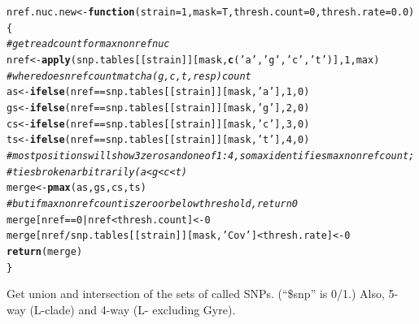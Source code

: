 \documentclass{article}\usepackage[]{graphicx}\usepackage[]{color}
\makeatletter
\newcommand{\hlnum}[1]{\textcolor[rgb]{0.686,0.059,0.569}{#1}}%
\newcommand{\hlstr}[1]{\textcolor[rgb]{0.192,0.494,0.8}{#1}}%
\newcommand{\hlcom}[1]{\textcolor[rgb]{0.678,0.584,0.686}{\textit{#1}}}%
\newcommand{\hlopt}[1]{\textcolor[rgb]{0,0,0}{#1}}%
\newcommand{\hlstd}[1]{\textcolor[rgb]{0.345,0.345,0.345}{#1}}%
\newcommand{\hlkwa}[1]{\textcolor[rgb]{0.161,0.373,0.58}{\textbf{#1}}}%
\newcommand{\hlkwb}[1]{\textcolor[rgb]{0.69,0.353,0.396}{#1}}%
\newcommand{\hlkwc}[1]{\textcolor[rgb]{0.333,0.667,0.333}{#1}}%
\newcommand{\hlkwd}[1]{\textcolor[rgb]{0.737,0.353,0.396}{\textbf{#1}}}%
\newenvironment{kframe}{%
 \def\at@end@of@kframe{}%
 \ifinner\ifhmode%
  \def\at@end@of@kframe{\end{minipage}}%
  \begin{minipage}{\columnwidth}%
 \fi\fi%
 \def\FrameCommand##1{\hskip\@totalleftmargin \hskip-\fboxsep
 \colorbox{shadecolor}{##1}\hskip-\fboxsep
     \hskip-\linewidth \hskip-\@totalleftmargin \hskip\columnwidth}%
 \MakeFramed {\advance\hsize-\width
   \@totalleftmargin\z@ \linewidth\hsize
   \@setminipage}}%
 {\par\unskip\endMakeFramed%
 \at@end@of@kframe}
\newenvironment{knitrout}{}{} %
\makeatother
\begin{document}
\begin{knitrout}\footnotesize
{}\color{fgcolor}\begin{kframe}
\begin{alltt}
\hlstd{nref.nuc.new} \hlkwb{<-} \hlkwa{function}\hlstd{(}\hlkwc{strain}\hlstd{=}\hlnum{1}\hlstd{,} \hlkwc{mask}\hlstd{=T,} \hlkwc{thresh.count}\hlstd{=}\hlnum{0}\hlstd{,} \hlkwc{thresh.rate}\hlstd{=}\hlnum{0.0}\hlstd{)\{}
        \hlcom{# get read count for max nonref nuc}
        \hlstd{nref} \hlkwb{<-} \hlkwd{apply}\hlstd{(snp.tables[[strain]][mask,} \hlkwd{c}\hlstd{(}\hlstr{'a'}\hlstd{,} \hlstr{'g'}\hlstd{,} \hlstr{'c'}\hlstd{,} \hlstr{'t'}\hlstd{)],} \hlnum{1}\hlstd{, max)}
        \hlcom{# where does nref count match a (g,c,t, resp) count}
        \hlstd{as} \hlkwb{<-} \hlkwd{ifelse}\hlstd{(nref} \hlopt{==} \hlstd{snp.tables[[strain]][mask,}\hlstr{'a'}\hlstd{],}\hlnum{1}\hlstd{,}\hlnum{0}\hlstd{)}
        \hlstd{gs} \hlkwb{<-} \hlkwd{ifelse}\hlstd{(nref} \hlopt{==} \hlstd{snp.tables[[strain]][mask,}\hlstr{'g'}\hlstd{],}\hlnum{2}\hlstd{,}\hlnum{0}\hlstd{)}
        \hlstd{cs} \hlkwb{<-} \hlkwd{ifelse}\hlstd{(nref} \hlopt{==} \hlstd{snp.tables[[strain]][mask,}\hlstr{'c'}\hlstd{],}\hlnum{3}\hlstd{,}\hlnum{0}\hlstd{)}
        \hlstd{ts} \hlkwb{<-} \hlkwd{ifelse}\hlstd{(nref} \hlopt{==} \hlstd{snp.tables[[strain]][mask,}\hlstr{'t'}\hlstd{],}\hlnum{4}\hlstd{,}\hlnum{0}\hlstd{)}
        \hlcom{# most positions will show 3 zeros and one of 1:4, so max identifies max nonref count;}
        \hlcom{# ties broken arbitrarily  (a<g<c<t)}
        \hlstd{merge} \hlkwb{<-} \hlkwd{pmax}\hlstd{(as,gs,cs,ts)}
        \hlcom{# but if max nonref count is zero or below threshold, return 0}
        \hlstd{merge[nref} \hlopt{==} \hlnum{0} \hlopt{|} \hlstd{nref} \hlopt{<} \hlstd{thresh.count]} \hlkwb{<-} \hlnum{0}
        \hlstd{merge[nref}\hlopt{/}\hlstd{snp.tables[[strain]][mask,}\hlstr{'Cov'}\hlstd{]} \hlopt{<} \hlstd{thresh.rate]} \hlkwb{<-} \hlnum{0}
        \hlkwd{return}\hlstd{(merge)}
\hlstd{\}}
\end{alltt}
\end{kframe}
\end{knitrout}

Get union and intersection of the sets of called SNPs. (``\$snp'' is 0/1.)  Also, 5-way (L-clade) and 4-way (L- excluding Gyre).
\end{document}
